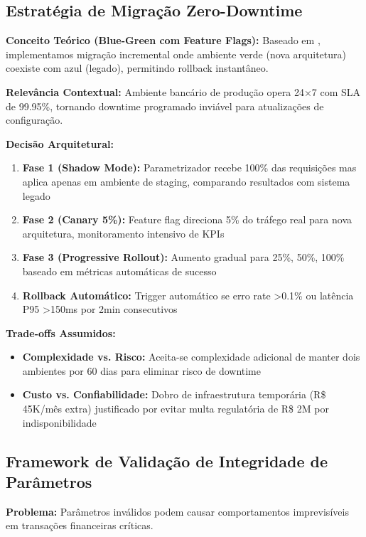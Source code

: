 \subsection{Estratégia de Migração Zero-Downtime}

\textbf{Conceito Teórico (Blue-Green com Feature Flags):} Baseado em , implementamos migração incremental onde ambiente verde (nova arquitetura) coexiste com azul (legado), permitindo rollback instantâneo.

\textbf{Relevância Contextual:} Ambiente bancário de produção opera 24×7 com SLA de 99.95\%, tornando downtime programado inviável para atualizações de configuração.

\textbf{Decisão Arquitetural:}
\begin{enumerate}
\item \textbf{Fase 1 (Shadow Mode):} Parametrizador recebe 100\% das requisições mas aplica apenas em ambiente de staging, comparando resultados com sistema legado
\item \textbf{Fase 2 (Canary 5\%):} Feature flag direciona 5\% do tráfego real para nova arquitetura, monitoramento intensivo de KPIs
\item \textbf{Fase 3 (Progressive Rollout):} Aumento gradual para 25\%, 50\%, 100\% baseado em métricas automáticas de sucesso
\item \textbf{Rollback Automático:} Trigger automático se erro rate >0.1\% ou latência P95 >150ms por 2min consecutivos
\end{enumerate}

\textbf{Trade-offs Assumidos:} 
\begin{itemize}
\item \textbf{Complexidade vs. Risco:} Aceita-se complexidade adicional de manter dois ambientes por 60 dias para eliminar risco de downtime
\item \textbf{Custo vs. Confiabilidade:} Dobro de infraestrutura temporária (R\$ 45K/mês extra) justificado por evitar multa regulatória de R\$ 2M por indisponibilidade
\end{itemize}

\subsection{Framework de Validação de Integridade de Parâmetros}

\textbf{Problema:} Parâmetros inválidos podem causar comportamentos imprevisíveis em transações financeiras críticas.

